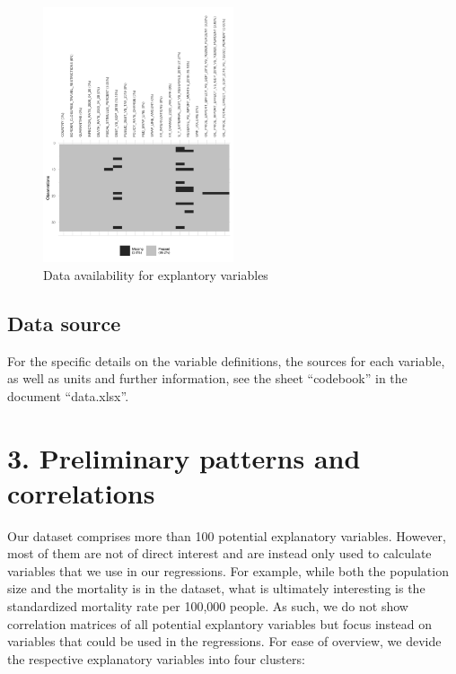 \documentclass[11pt,]{article}
\begin{document}
\begin{figure}
\centering
\includegraphics[width=0.5\textwidth,height=\textheight]{reportfigures/missingdata_predictors.png}
\caption{Data availability for explantory variables}
\end{figure}

\hypertarget{data-source}{%
\subsection{Data source}\label{data-source}}

For the specific details on the variable definitions, the sources for
each variable, as well as units and further information, see the sheet
``codebook'' in the document ``data.xlsx''.

\hypertarget{preliminary-patterns-and-correlations}{%
\section{3. Preliminary patterns and
correlations}\label{preliminary-patterns-and-correlations}}

Our dataset comprises more than 100 potential explanatory variables.
However, most of them are not of direct interest and are instead only
used to calculate variables that we use in our regressions. For example,
while both the population size and the mortality is in the dataset, what
is ultimately interesting is the standardized mortality rate per 100,000
people. As such, we do not show correlation matrices of all potential
explantory variables but focus instead on variables that could be used
in the regressions. For ease of overview, we devide the respective
explanatory variables into four clusters:
\end{document}
